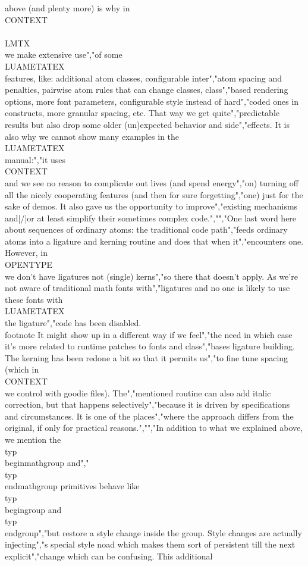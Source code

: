 above (and plenty more) is why in \\CONTEXT\\ \\LMTX\\ we make extensive use","of some \\LUAMETATEX\\ features, like: additional atom classes, configurable inter","atom spacing and penalties, pairwise atom rules that can change classes, class","based rendering options, more font parameters, configurable style instead of hard","coded ones in constructs, more granular spacing, etc. That way we get quite","predictable results but also drop some older (un)expected behavior and side","effects. It is also why we cannot show many examples in the \\LUAMETATEX\\ manual:","it uses \\CONTEXT\\ and we see no reason to complicate out lives (and spend energy","on) turning off all the nicely cooperating features (and then for sure forgetting","one) just for the sake of demos. It also gave us the opportunity to improve","existing mechanisms and|/|or at least simplify their sometimes complex code.","","One last word here about sequences of ordinary atoms: the traditional code path","feeds ordinary atoms into a ligature and kerning routine and does that when it","encounters one. However, in \\OPENTYPE\\ we don't have ligatures not (single) kerns","so there that doesn't apply. As we're not aware of traditional math fonts with","ligatures and no one is likely to use these fonts with \\LUAMETATEX\\ the ligature","code has been disabled. \\footnote {It might show up in a different way if we feel","the need in which case it's more related to runtime patches to fonts and class","bases ligature building.} The kerning has been redone a bit so that it permits us","to fine tune spacing (which in \\CONTEXT\\ we control with goodie files). The","mentioned routine can also add italic correction, but that happens selectively","because it is driven by specifications and circumstances. It is one of the places","where the approach differs from the original, if only for practical reasons.","","In addition to what we explained above, we mention the \\typ {\\beginmathgroup} and","\\typ {\\endmathgroup} primitives behave like \\typ {\\begingroup} and \\typ {\\endgroup}","but restore a style change inside the group. Style changes are actually injecting","s special style noad which makes them sort of persistent till the next explicit","change which can be confusing. This additional 